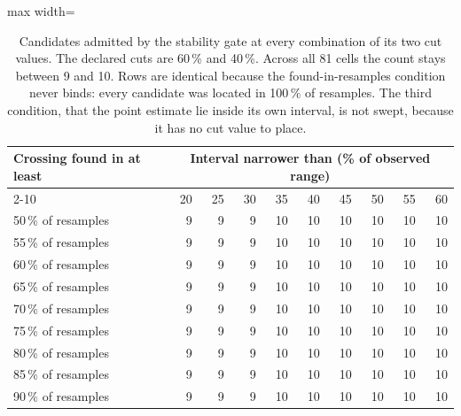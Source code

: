 \begin{table}[H]
\caption{Candidates admitted by the stability gate at every combination of its two cut values. The declared cuts are 60\,\% and 40\,\%. Across all 81 cells the count stays between 9 and 10. Rows are identical because the found-in-resamples condition never binds: every candidate was located in 100\,\% of resamples. The third condition, that the point estimate lie inside its own interval, is not swept, because it has no cut value to place.}
\label{tab:gate_sweep}
\begin{adjustbox}{max width=\textwidth}
\begin{tabular}{lrrrrrrrrr}
\toprule
Crossing found in at least & \multicolumn{9}{c}{Interval narrower than (\% of observed range)} \\
\cmidrule(l){2-10}
 & 20 & 25 & 30 & 35 & 40 & 45 & 50 & 55 & 60 \\
\midrule
50\,\% of resamples & 9 & 9 & 9 & 10 & 10 & 10 & 10 & 10 & 10 \\
55\,\% of resamples & 9 & 9 & 9 & 10 & 10 & 10 & 10 & 10 & 10 \\
60\,\% of resamples & 9 & 9 & 9 & 10 & 10 & 10 & 10 & 10 & 10 \\
65\,\% of resamples & 9 & 9 & 9 & 10 & 10 & 10 & 10 & 10 & 10 \\
70\,\% of resamples & 9 & 9 & 9 & 10 & 10 & 10 & 10 & 10 & 10 \\
75\,\% of resamples & 9 & 9 & 9 & 10 & 10 & 10 & 10 & 10 & 10 \\
80\,\% of resamples & 9 & 9 & 9 & 10 & 10 & 10 & 10 & 10 & 10 \\
85\,\% of resamples & 9 & 9 & 9 & 10 & 10 & 10 & 10 & 10 & 10 \\
90\,\% of resamples & 9 & 9 & 9 & 10 & 10 & 10 & 10 & 10 & 10 \\
\bottomrule
\end{tabular}
\end{adjustbox}
\end{table}
